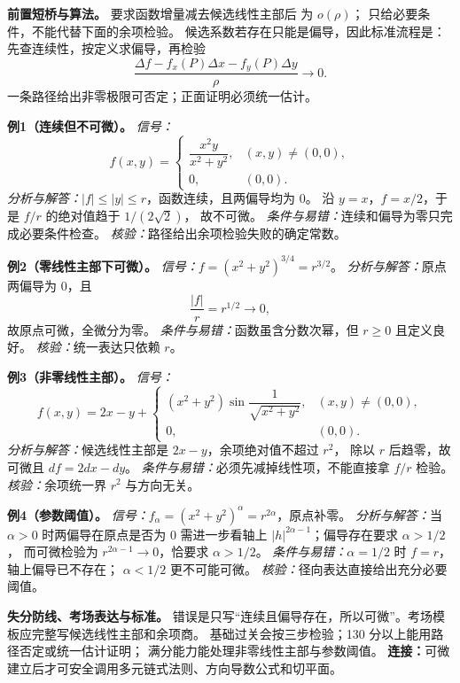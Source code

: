 
\begin{knowledgeBox}
\textbf{前置短桥与算法。}
要求函数增量减去候选线性主部后
为 \(o(\rho)\)；
只给必要条件，不能代替下面的余项检验。
候选系数若存在只能是偏导，因此标准流程是：
先查连续性，按定义求偏导，再检验
\[
\frac{\Delta f-f_x(P)\Delta x-f_y(P)\Delta y}{\rho}\to0.
\]
一条路径给出非零极限可否定；正面证明必须统一估计。

\textbf{例1（连续但不可微）。}
\emph{信号：}
\[
f(x,y)=
\begin{cases}\dfrac{x^2y}{x^2+y^2},&(x,y)\ne(0,0),\\0,&(0,0).\end{cases}
\]
\emph{分析与解答：}\(|f|\le|y|\le r\)，函数连续，且两偏导均为 \(0\)。
沿 \(y=x\)，\(f=x/2\)，于是 \(f/r\) 的绝对值趋于 \(1/(2\sqrt2)\)，
故不可微。
\emph{条件与易错：}连续和偏导为零只完成必要条件检查。
\emph{核验：}路径给出余项检验失败的确定常数。

\textbf{例2（零线性主部下可微）。}
\emph{信号：}\(f=(x^2+y^2)^{3/4}=r^{3/2}\)。
\emph{分析与解答：}原点两偏导为 \(0\)，且
\[
\frac{|f|}{r}=r^{1/2}\to0,
\]
故原点可微，全微分为零。
\emph{条件与易错：}函数虽含分数次幂，但 \(r\ge0\) 且定义良好。
\emph{核验：}统一表达只依赖 \(r\)。

\textbf{例3（非零线性主部）。}
\emph{信号：}
\[
f(x,y)=2x-y+
\begin{cases}(x^2+y^2)\sin\dfrac1{\sqrt{x^2+y^2}},&(x,y)\ne(0,0),\\0,&(0,0).\end{cases}
\]
\emph{分析与解答：}候选线性主部是 \(2x-y\)，余项绝对值不超过 \(r^2\)，
除以 \(r\) 后趋零，故可微且 \(df=2dx-dy\)。
\emph{条件与易错：}必须先减掉线性项，不能直接拿 \(f/r\) 检验。
\emph{核验：}余项统一界 \(r^2\) 与方向无关。

\textbf{例4（参数阈值）。}
\emph{信号：}\(f_\alpha=(x^2+y^2)^\alpha=r^{2\alpha}\)，原点补零。
\emph{分析与解答：}当 \(\alpha>0\) 时两偏导在原点是否为 \(0\) 需进一步看轴上
\(|h|^{2\alpha-1}\)；偏导存在要求 \(\alpha>1/2\)，
而可微检验为 \(r^{2\alpha-1}\to0\)，恰要求 \(\alpha>1/2\)。
\emph{条件与易错：}\(\alpha=1/2\) 时 \(f=r\)，轴上偏导已不存在；
\(\alpha<1/2\) 更不可能可微。
\emph{核验：}径向表达直接给出充分必要阈值。

\textbf{失分防线、考场表达与标准。}
错误是只写“连续且偏导存在，所以可微”。考场模板应完整写候选线性主部和余项商。
基础过关会按三步检验；130 分以上能用路径否定或统一估计证明；
满分能力能处理非零线性主部与参数阈值。
\textbf{连接：}可微建立后才可安全调用多元链式法则、方向导数公式和切平面。
\end{knowledgeBox}

